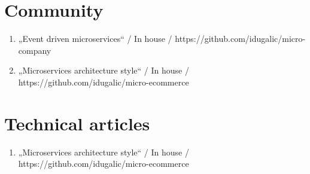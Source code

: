\section*{Community}
\begin{enumerate}[label=,leftmargin=0cm,itemsep=10pt]
\item „Event driven microservices“ / In house / https://github.com/idugalic/micro-company
\item „Microservices architecture style“ / In house / https://github.com/idugalic/micro-ecommerce
\end{enumerate}

\section*{Technical articles}
\begin{enumerate}[label=,leftmargin=0cm,itemsep=10pt]
\item „Microservices architecture style“ / In house / https://github.com/idugalic/micro-ecommerce
\end{enumerate}
